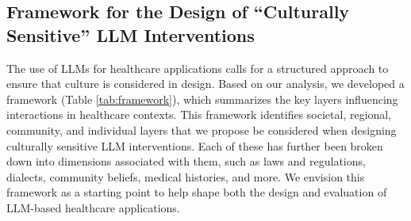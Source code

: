 \subsection{Framework for the Design of ``Culturally Sensitive'' LLM Interventions}

The use of LLMs for healthcare applications calls for a structured approach to ensure that culture is considered in design.
Based on our analysis, we developed a framework (Table \ref{tab:framework}), which summarizes the key layers influencing interactions in healthcare contexts. This framework identifies societal, regional, community, and individual layers that we propose be considered when designing culturally sensitive LLM interventions. Each of these has further been broken down into dimensions associated with them, such as laws and regulations, dialects, community beliefs, medical histories, and more.
We envision this framework as a starting point to help shape both the design and evaluation of LLM-based healthcare applications.

